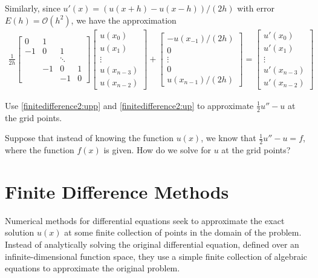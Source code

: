 Similarly, since  $u'(x) = (u(x+h) - u(x-h))/(2h)$ with error $E(h) = \mathcal{O}(h^2)$, we have the approximation 
\begin{align}
\frac{1}{2h}
\begin{bmatrix}
0 & 1 & \\
-1 & 0 & 1  \\
& &\ddots & \\
 & -1 & 0 & 1 \\
 & & -1 & 0
\end{bmatrix}
\begin{bmatrix}
u(x_0) \\ u(x_1)\\ \vdots  \\ u(x_{n-3}) \\ u(x_{n-2})
\end{bmatrix} + 
\begin{bmatrix}
-u(x_{-1})/(2h) \\ 0 \\ \vdots  \\ 0 \\ u(x_{n-1})/(2h)
\end{bmatrix} = 
\begin{bmatrix}
u'(x_0) \\ u'(x_1)\\ \vdots  \\ u'(x_{n-3}) \\ u'(x_{n-2})
\end{bmatrix}\label{finitedifference2:up}
\end{align}

\begin{problem}
	Use \eqref{finitedifference2:upp} and \eqref{finitedifference2:up} to approximate $\frac{1}{2}u'' - u$ at the grid points.
\end{problem}

Suppose that instead of knowing the function $u(x)$, we know that $\frac{1}{2}u'' - u = f$, where the function $f(x)$ is given. 
How do we solve for $u$ at the grid points?

\section{Finite Difference Methods}

Numerical methods for differential equations seek to approximate the exact solution $u(x)$ at some finite collection of points in the domain of the problem.
Instead of analytically solving the original differential equation, defined over an infinite-dimensional function space, they use a simple finite collection of algebraic equations to approximate the original problem.
 
